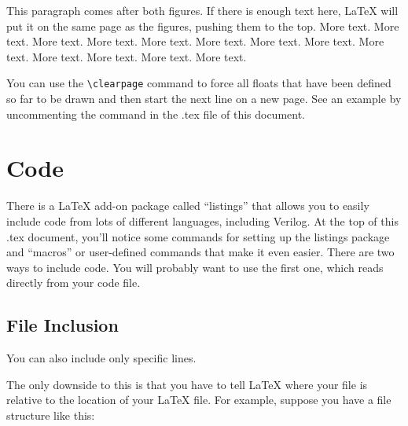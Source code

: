 \documentclass[11pt]{article}
\newcommand{\Verilog}[2][]{%
	
}
\begin{document}

This paragraph comes after both figures. If there is enough text here, LaTeX will put it on the same page as the figures, pushing them to the top.  More text. More text. More text. More text. More text. More text. More text. More text. More text. More text. More text. More text. More text.

You can use the \verb|\clearpage| command to force all floats that have been defined so far to be drawn and then start the next line on a new page.  See an example by uncommenting the command in the .tex file of this document.


\section*{Code}
There is a LaTeX add-on package called ``listings'' that allows you to easily include code from lots of different languages, including Verilog.  At the top of this .tex document, you'll notice some commands for setting up the listings package and ``macros'' or user-defined commands that make it even easier.  There are two ways to include code.  You will probably want to use the first one, which reads directly from your code file.  

\subsection*{File Inclusion}

\Verilog[caption=File-included Verilog code example,label=code:file_ex]{example_or.sv}

You can also include only specific lines.

\Verilog[firstline=6, lastline=7, caption=Selected lines from example file,
label=code:file_ex_lines]{example_or.sv}

The only downside to this is that you have to tell LaTeX where your file is relative to the location of your LaTeX file.  For example, suppose you have a file structure like this:
\end{document}
